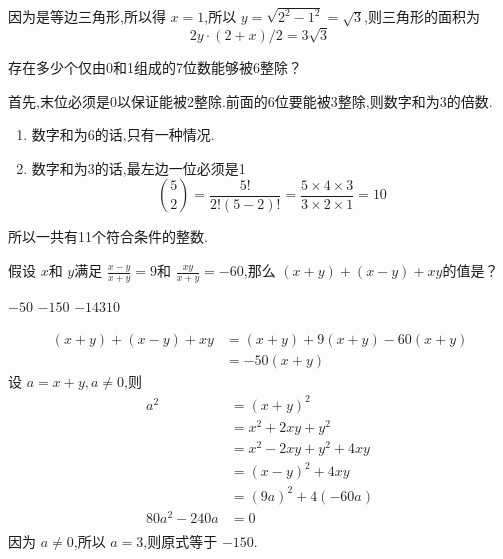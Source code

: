 \documentclass[answers]{exam}
\begin{document}
\begin{questions}
\begin{solution}
		因为是等边三角形,所以得 \( x = 1 \),所以 \( y = \sqrt{2^2 - 1^2} = \sqrt{3} \),则三角形的面积为
		\[
			2y \cdot (2 + x) / 2=  3\sqrt{3}
		\]
	\end{solution}

	\question 存在多少个仅由0和1组成的7位数能够被6整除？

	\begin{oneparchoices}
		    
	\end{oneparchoices}

	\begin{solution}
		首先,末位必须是0以保证能被2整除.前面的6位要能被3整除,则数字和为3的倍数.
		\begin{enumerate}
			\item 数字和为6的话,只有一种情况.
			\item 数字和为3的话,最左边一位必须是1
			      \begin{equation*}
				      \binom{5}{2} = \frac{5!}{2!(5-2)!} = \frac{5 \times 4 \times 3}{3 \times 2 \times 1} = 10
			      \end{equation*}
		\end{enumerate}
		所以一共有11个符合条件的整数.
	\end{solution}

	\question 假设 \( x \)和 \( y \)满足 \( \frac{x-y}{x+y}=9 \)和 \( \frac{xy}{x+y}=-60 \),那么 \( (x+y) + (x-y) + xy
	\)的值是？

	\begin{oneparchoices}
		\choice \( -50 \) \CorrectChoice \( -150 \) \choice \( -14310 \)  \choice 14160
	\end{oneparchoices}

	\begin{solution}
		\begin{align*}
			(x+y) + (x-y) + xy & = (x+y) + 9(x+y) -60(x+y) \\
			                   & = -50(x+y)
		\end{align*}
		设 \( a = x + y, a \ne 0 \),则
		\begin{align*}
			a^2         & = (x+y)^2              \\
			            & = x^2 + 2xy + y^2      \\
			            & = x^2 - 2xy + y^2 +4xy \\
			            & = (x-y)^2 + 4xy        \\
			            & = (9a)^2 + 4(-60a)     \\
			80a^2 -240a & = 0                    \\
		\end{align*}
		因为 \( a \ne 0 \),所以 \( a = 3 \),则原式等于 \( -150 \).
	\end{solution}


\end{questions}
\end{document}
